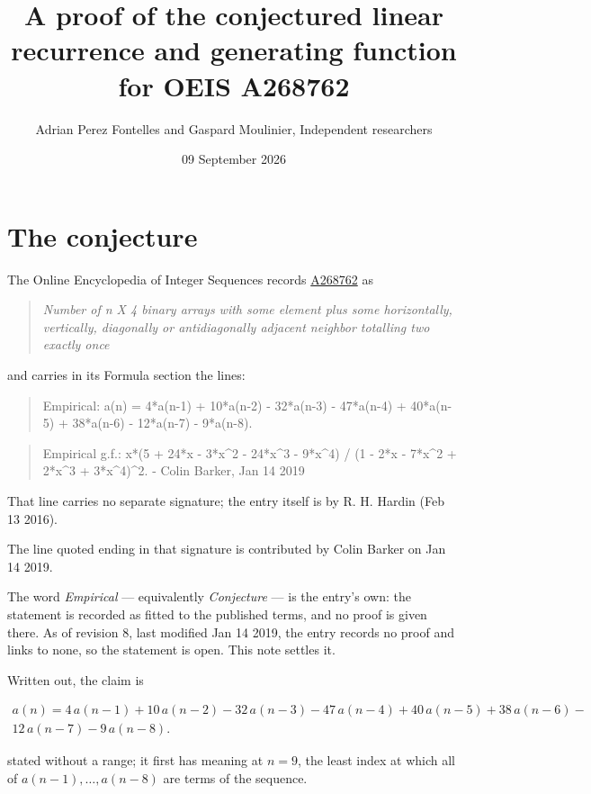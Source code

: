 \documentclass[11pt]{article}
\title{A proof of the conjectured linear recurrence and generating function for OEIS A268762}
\author{Adrian Perez Fontelles and Gaspard Moulinier, Independent researchers}
\date{09 September 2026}
\theoremstyle{definition}
\begin{document}
\maketitle
\section{The conjecture}

The Online Encyclopedia of Integer Sequences records \href{https://oeis.org/A268762}{A268762} as

\begin{quote}\itshape Number of n X 4 binary arrays with some element plus some horizontally, vertically, diagonally or antidiagonally adjacent neighbor totalling two exactly once\end{quote}

and carries in its Formula section the lines:

\begin{quote}\ttfamily Empirical: a(n) = 4*a(n-1) + 10*a(n-2) - 32*a(n-3) - 47*a(n-4) + 40*a(n-5) + 38*a(n-6) - 12*a(n-7) - 9*a(n-8).\end{quote}

\begin{quote}\ttfamily Empirical g.f.: x*(5 + 24*x - 3*x\textasciicircum{}2 - 24*x\textasciicircum{}3 - 9*x\textasciicircum{}4) / (1 - 2*x - 7*x\textasciicircum{}2 + 2*x\textasciicircum{}3 + 3*x\textasciicircum{}4)\textasciicircum{}2. - Colin Barker, Jan 14 2019\end{quote}

That line carries no separate signature; the entry itself is by R. H. Hardin (Feb 13 2016).

The line quoted ending in that signature is contributed by Colin Barker on Jan 14 2019.

The word {\itshape Empirical} --- equivalently {\itshape Conjecture} --- is the entry's own: the statement is recorded as fitted to the published terms, and no proof is given there. As of revision 8, last modified Jan 14 2019, the entry records no proof and links to none, so the statement is open. This note settles it.

Written out, the claim is

\begin{multline*} a(n) = 4\,a(n-1) + 10\,a(n-2) - 32\,a(n-3) - 47\,a(n-4) + 40\,a(n-5) + 38\,a(n-6) - \\ 12\,a(n-7) - 9\,a(n-8). \end{multline*}

stated without a range; it first has meaning at $n = 9$, the least index at which all of $a(n-1),\dots,a(n-8)$ are terms of the sequence.
\end{document}
